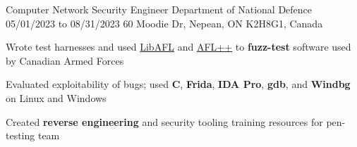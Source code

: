 

\begin{cventries}

  \cventry
    {Computer Network Security Engineer} %
    {Department of National Defence} %
    {05/01/2023 to 08/31/2023} %
    {60 Moodie Dr, Nepean, ON K2H8G1, Canada} %
    {
      \begin{cvitems} %
        \item{Wrote test harnesses and used \href{https://aflplus.plus/libafl-book/}{LibAFL} and \href{https://aflplus.plus}{AFL++} to \textbf{fuzz-test} software used by Canadian Armed Forces}
        \item{Evaluated exploitability of bugs; used \textbf{C}, \textbf{Frida}, \textbf{IDA Pro}, \textbf{gdb}, and \textbf{Windbg} on Linux and Windows}
        \item{Created \textbf{reverse engineering} and security tooling training resources for pen-testing team} %
      \end{cvitems}
    }


\end{cventries}
